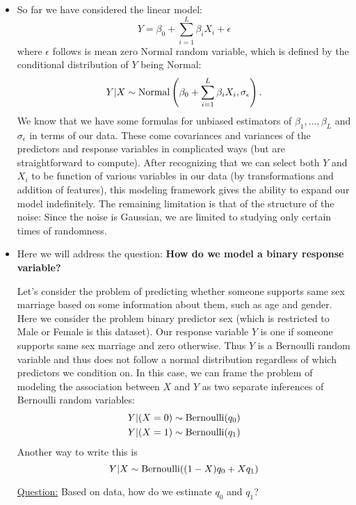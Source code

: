 \begin{itemize}
\item So far we have considered the linear model: 
\begin{equation}
Y = \beta_0 + \sum_{i=1}^L \beta_i X_i + \epsilon
\end{equation}
where $\epsilon$ follows is mean zero Normal random variable, which is defined by the conditional distribution of $Y$ being Normal: 
\begin{equation}
Y|X \sim {\rm Normal}\left( \beta_0 + \sum_{i=1}^L \beta_i X_i ,\sigma_{\epsilon} \right). 
\end{equation}
 We know that we have some formulas for unbiased estimators of $\beta_1,\dots,\beta_L$ and $\sigma_{\epsilon}$ in terms of our data. These come covariances and variances of the predictors and response variables in complicated ways (but are straightforward to compute).  After recognizing that we can select both $Y$ and $X_i$ to be function of various variables in our data (by transformations and addition of features), this modeling framework gives the ability to expand our model indefinitely. The remaining limitation is that of the structure of the noise: Since the noise is Gaussian, we are limited to studying only certain times of randomness. 
\item Here we will address the question: {\bf How do we model a binary response variable?} 
\begin{example}
Let's consider the problem of predicting whether someone supports same sex marriage based on some information about them, such as age and gender.  Here we consider the problem binary predictor sex (which is restricted to Male or Female is this dataset). Our response variable $Y$ is one if someone supports same sex marriage and zero otherwise. 
Thus $Y$ is a Bernoulli random variable and thus does not follow a normal distribution regardless of which predictors we condition on. In this case, we can frame the problem of modeling the association between $X$ and $Y$ as two separate inferences of Bernoulli random variables: 
\begin{align*}
Y|(X=0) &\sim {\rm Bernoulli}(q_0)\\
Y|(X=1) &\sim {\rm Bernoulli}(q_1)
\end{align*}
Another way to write this is 
\begin{equation*}
Y|X \sim {\rm Bernoulli}((1-X)q_0 + Xq_1)
\end{equation*}

\noindent
\underline{Question:} Based on data, how do we estimate $q_0$ and $q_1$? \\



\end{example}
\end{itemize}
